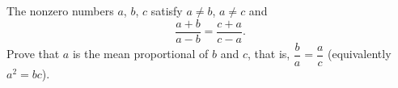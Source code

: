 The nonzero numbers $a$, $b$, $c$ satisfy $a\ne b$, $a\ne c$ and
\[
\dfrac{a+b}{a-b}=\dfrac{c+a}{c-a}.
\]
Prove that $a$ is the mean proportional of $b$ and $c$, that is, $\dfrac {b}{a}=\dfrac {a}{c}$ (equivalently $a^2=bc$).
